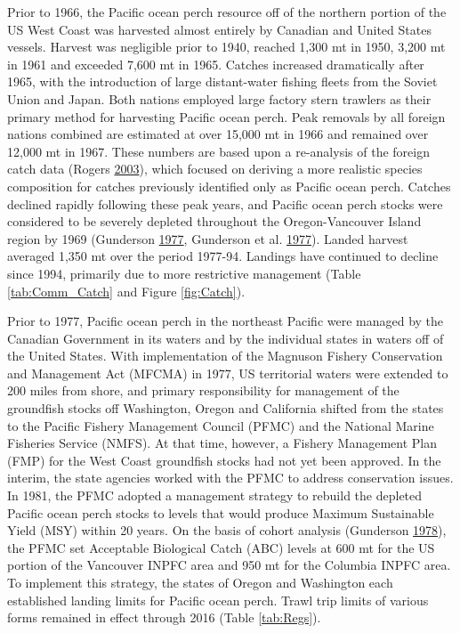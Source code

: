 \documentclass[12pt,]{article}
\begin{document}
Prior to 1966, the Pacific ocean perch resource off of the northern
portion of the US West Coast was harvested almost entirely by Canadian
and United States vessels. Harvest was negligible prior to 1940, reached
1,300 mt in 1950, 3,200 mt in 1961 and exceeded 7,600 mt in 1965.
Catches increased dramatically after 1965, with the introduction of
large distant-water fishing fleets from the Soviet Union and Japan. Both
nations employed large factory stern trawlers as their primary method
for harvesting Pacific ocean perch. Peak removals by all foreign nations
combined are estimated at over 15,000 mt in 1966 and remained over
12,000 mt in 1967. These numbers are based upon a re-analysis of the
foreign catch data (Rogers
\protect\hyperlink{ref-rogers_species_2003}{2003}), which focused on
deriving a more realistic species composition for catches previously
identified only as Pacific ocean perch. Catches declined rapidly
following these peak years, and Pacific ocean perch stocks were
considered to be severely depleted throughout the Oregon-Vancouver
Island region by 1969 (Gunderson
\protect\hyperlink{ref-gunderson_population_1977}{1977}, Gunderson et
al. \protect\hyperlink{ref-gunderson_status_1977}{1977}). Landed harvest
averaged 1,350 mt over the period 1977-94. Landings have continued to
decline since 1994, primarily due to more restrictive management (Table
\ref{tab:Comm_Catch} and Figure \ref{fig:Catch}).

Prior to 1977, Pacific ocean perch in the northeast Pacific were managed
by the Canadian Government in its waters and by the individual states in
waters off of the United States. With implementation of the Magnuson
Fishery Conservation and Management Act (MFCMA) in 1977, US territorial
waters were extended to 200 miles from shore, and primary responsibility
for management of the groundfish stocks off Washington, Oregon and
California shifted from the states to the Pacific Fishery Management
Council (PFMC) and the National Marine Fisheries Service (NMFS). At that
time, however, a Fishery Management Plan (FMP) for the West Coast
groundfish stocks had not yet been approved. In the interim, the state
agencies worked with the PFMC to address conservation issues. In 1981,
the PFMC adopted a management strategy to rebuild the depleted Pacific
ocean perch stocks to levels that would produce Maximum Sustainable
Yield (MSY) within 20 years. On the basis of cohort analysis (Gunderson
\protect\hyperlink{ref-gunderson_results_1978}{1978}), the PFMC set
Acceptable Biological Catch (ABC) levels at 600 mt for the US portion of
the Vancouver INPFC area and 950 mt for the Columbia INPFC area. To
implement this strategy, the states of Oregon and Washington each
established landing limits for Pacific ocean perch. Trawl trip limits of
various forms remained in effect through 2016 (Table \ref{tab:Regs}).
\end{document}
